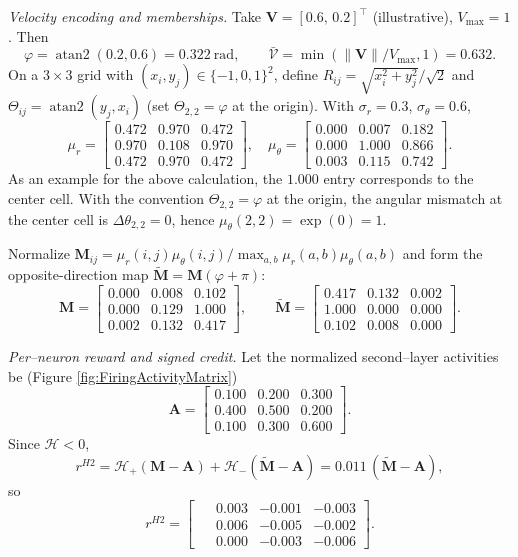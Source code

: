 \emph{Velocity encoding and memberships.}
Take $\mathbf{V}=[0.6,\,0.2]^\top$ (illustrative), $V_{\max}=1$. Then
\[
\varphi=\operatorname{atan2}(0.2,0.6)=0.322~\mathrm{rad},\qquad
\bar{\mathcal{V}}=\min(\|\mathbf{V}\|/V_{\max},1)=0.632.
\]
On a $3\times 3$ grid with $(x_i,y_j)\in\{-1,0,1\}^2$, define
$R_{ij}=\sqrt{x_i^2+y_j^2}/\sqrt{2}$ and
$\Theta_{ij}=\operatorname{atan2}(y_j,x_i)$ (set $\Theta_{2,2}=\varphi$ at the origin).
With $\sigma_r=0.3$, $\sigma_\theta=0.6$,
\[
\mu_r=
\begin{bmatrix}
0.472&0.970&0.472\\
0.970&0.108&0.970\\
0.472&0.970&0.472
\end{bmatrix},\quad
\mu_\theta=
\begin{bmatrix}
0.000&0.007&0.182\\
0.000&1.000&0.866\\
0.003&0.115&0.742
\end{bmatrix}.
\]
As an example for the above calculation, the $1.000$ entry corresponds to the center cell. With the convention $\Theta_{2,2}=\varphi$ at the origin, the angular mismatch at the center cell is $\Delta\theta_{2,2}=0$, hence $\mu_\theta(2,2)=\exp(0)=1$.

Normalize \(\mathbf{M}_{ij}=\mu_r(i,j)\mu_\theta(i,j)/\max_{a,b}\mu_r(a,b)\mu_\theta(a,b)\) and form the opposite-direction map \(\widetilde{\mathbf{M}}=\mathbf{M}(\varphi+\pi)\):
\[
\mathbf{M}=
\begin{bmatrix}
0.000&0.008&0.102\\
0.000&0.129&1.000\\
0.002&0.132&0.417
\end{bmatrix},\qquad
\widetilde{\mathbf{M}}=
\begin{bmatrix}
0.417&0.132&0.002\\
1.000&0.000&0.000\\
0.102&0.008&0.000
\end{bmatrix}.
\]

\emph{Per–neuron reward and signed credit.}
Let the normalized second–layer activities be (Figure \eqref{fig:FiringActivityMatrix})
\[
\mathbf{A}=
\begin{bmatrix}
0.100&0.200&0.300\\
0.400&0.500&0.200\\
0.100&0.300&0.600
\end{bmatrix}.
\]
Since $\mathcal{H}<0$,
\[
r^{H2}=\mathcal{H}_+(\mathbf{M}-\mathbf{A})+\mathcal{H}_-(\widetilde{\mathbf{M}}-\mathbf{A})=0.011\,(\widetilde{\mathbf{M}}-\mathbf{A}),
\]
so
\[
r^{H2}=
\begin{bmatrix}
\phantom{-}0.003&-0.001&-0.003\\
\phantom{-}0.006&-0.005&-0.002\\
\phantom{-}0.000&-0.003&-0.006
\end{bmatrix}.
\]

